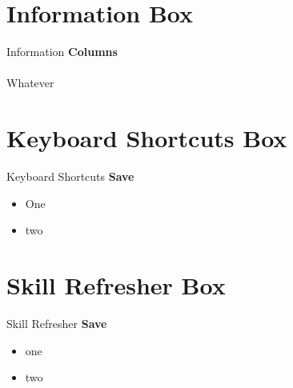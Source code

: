 \section{Information Box}
\begin{center}
	\begin{infobox}{Information}
		\textbf{Columns}
		\\
		\\
		Whatever
	\end{infobox}
\end{center}

\section{Keyboard Shortcuts Box}
\begin{center}
	\begin{shtcutbox}{Keyboard Shortcuts}
		\textbf{Save}
		\\
		\begin{itemize}
			\setlength{\itemsep}{0pt}
			\setlength{\parskip}{0pt}
			\setlength{\parsep}{0pt}
			
			\item One
			\item two
			
		\end{itemize}
	\end{shtcutbox}
\end{center}

\section{Skill Refresher Box}
\begin{center}
	\begin{sklbox}{Skill Refresher}
		\textbf{Save}
		\\
		\begin{itemize}
			\setlength{\itemsep}{0pt}
			\setlength{\parskip}{0pt}
			\setlength{\parsep}{0pt}
			
			\item one
			\item two
			
		\end{itemize}
	\end{sklbox}
\end{center}


